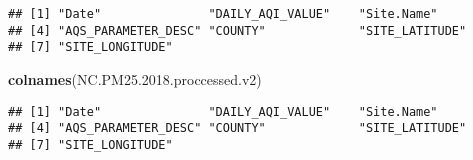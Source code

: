 \documentclass[]{article}
\newenvironment{Shaded}{\begin{snugshade}}{\end{snugshade}}
\newcommand{\KeywordTok}[1]{\textcolor[rgb]{0.13,0.29,0.53}{\textbf{#1}}}
\newcommand{\FloatTok}[1]{\textcolor[rgb]{0.00,0.00,0.81}{#1}}
\newcommand{\StringTok}[1]{\textcolor[rgb]{0.31,0.60,0.02}{#1}}
\newcommand{\CommentTok}[1]{\textcolor[rgb]{0.56,0.35,0.01}{\textit{#1}}}
\newcommand{\OperatorTok}[1]{\textcolor[rgb]{0.81,0.36,0.00}{\textbf{#1}}}
\newcommand{\NormalTok}[1]{#1}
\begin{document}
\begin{verbatim}
## [1] "Date"               "DAILY_AQI_VALUE"    "Site.Name"         
## [4] "AQS_PARAMETER_DESC" "COUNTY"             "SITE_LATITUDE"     
## [7] "SITE_LONGITUDE"
\end{verbatim}

\begin{Shaded}
\begin{Highlighting}[]
\KeywordTok{colnames}\NormalTok{(NC.PM25.}\FloatTok{2018.}\NormalTok{proccessed.v2)}
\end{Highlighting}
\end{Shaded}

\begin{verbatim}
## [1] "Date"               "DAILY_AQI_VALUE"    "Site.Name"         
## [4] "AQS_PARAMETER_DESC" "COUNTY"             "SITE_LATITUDE"     
## [7] "SITE_LONGITUDE"
\end{verbatim}

\begin{Shaded}
\end{Shaded}
\end{document}

